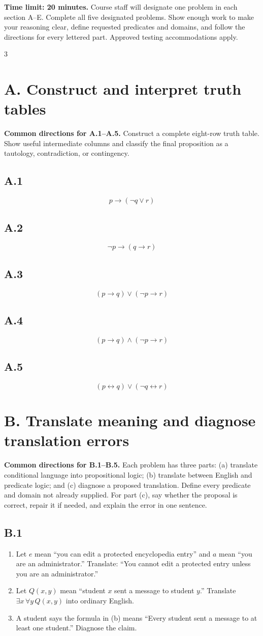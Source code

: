 \documentclass{article}
\newcommand{\problem}[1]{%
  \par
  \subsection*{#1}%
}
\begin{document}
\begin{tcolorbox}
\textbf{Time limit: 20 minutes.} Course staff will designate one problem in
each section A--E. Complete all five designated problems. Show enough work to
make your reasoning clear, define requested predicates and domains, and follow
the directions for every lettered part. Approved testing accommodations apply.
\end{tcolorbox}

\begin{multicols}{3}

\section*{A. Construct and interpret truth tables}

\textbf{Common directions for A.1--A.5.} Construct a complete eight-row truth
table. Show useful intermediate columns and classify the final proposition as
a tautology, contradiction, or contingency.

\problem{A.1}
\[
  p\to(\neg q\lor r)
\]

\problem{A.2}
\[
  \neg p\to(q\to r)
\]

\problem{A.3}
\[
  (p\to q)\lor(\neg p\to r)
\]

\problem{A.4}
\[
  (p\to q)\land(\neg p\to r)
\]

\problem{A.5}
\[
  (p\leftrightarrow q)\lor(\neg q\leftrightarrow r)
\]
\section*{B. Translate meaning and diagnose translation errors}

\textbf{Common directions for B.1--B.5.} Each problem has three parts:
(a) translate conditional language into propositional logic; (b) translate
between English and predicate logic; and (c) diagnose a proposed translation.
Define every predicate and domain not already supplied. For part (c), say
whether the proposal is correct, repair it if needed, and explain the error in
one sentence.

\problem{B.1}
\begin{enumerate}[label=(\alph*)]
  \item Let $e$ mean ``you can edit a protected encyclopedia entry'' and $a$
        mean ``you are an administrator.'' Translate: ``You cannot edit a
        protected entry unless you are an administrator.''
  \item Let $Q(x,y)$ mean ``student $x$ sent a message to student $y$.''
        Translate $\exists x\,\forall y\,Q(x,y)$ into ordinary English.
  \item A student says the formula in (b) means ``Every student sent a message
        to at least one student.'' Diagnose the claim.
\end{enumerate}


\end{multicols}
\end{document}
